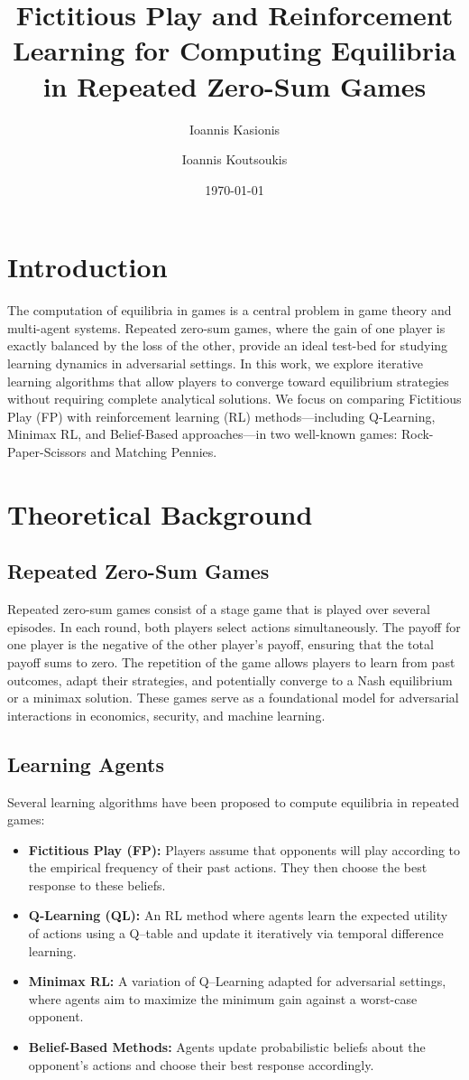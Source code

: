 \documentclass[11pt]{article}
\title{Fictitious Play and Reinforcement Learning for Computing Equilibria in Repeated Zero-Sum Games}
\author{Ioannis Kasionis \and Ioannis Koutsoukis}
\date{\today}
\begin{document}
\maketitle

\section{Introduction}
The computation of equilibria in games is a central problem in game theory and multi-agent systems. Repeated zero-sum games, where the gain of one player is exactly balanced by the loss of the other, provide an ideal test-bed for studying learning dynamics in adversarial settings. In this work, we explore iterative learning algorithms that allow players to converge toward equilibrium strategies without requiring complete analytical solutions. We focus on comparing Fictitious Play (FP) with reinforcement learning (RL) methods—including Q-Learning, Minimax RL, and Belief-Based approaches—in two well-known games: Rock-Paper-Scissors and Matching Pennies.

\section{Theoretical Background}

\subsection{Repeated Zero-Sum Games}
Repeated zero-sum games consist of a stage game that is played over several episodes. In each round, both players select actions simultaneously. The payoff for one player is the negative of the other player's payoff, ensuring that the total payoff sums to zero. The repetition of the game allows players to learn from past outcomes, adapt their strategies, and potentially converge to a Nash equilibrium or a minimax solution. These games serve as a foundational model for adversarial interactions in economics, security, and machine learning.

\subsection{Learning Agents}
Several learning algorithms have been proposed to compute equilibria in repeated games:
\begin{itemize}
    \item \textbf{Fictitious Play (FP):} Players assume that opponents will play according to the empirical frequency of their past actions. They then choose the best response to these beliefs.
    \item \textbf{Q-Learning (QL):} An RL method where agents learn the expected utility of actions using a Q–table and update it iteratively via temporal difference learning.
    \item \textbf{Minimax RL:} A variation of Q–Learning adapted for adversarial settings, where agents aim to maximize the minimum gain against a worst-case opponent.
    \item \textbf{Belief-Based Methods:} Agents update probabilistic beliefs about the opponent's actions and choose their best response accordingly.
\end{itemize}
\end{document}
